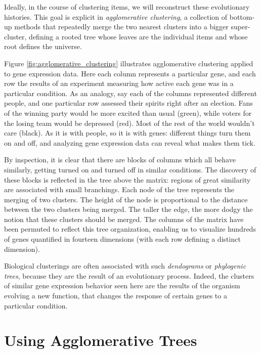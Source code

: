\documentclass[10pt]{article}
\begin{document}
Ideally, in the course of clustering items, we will reconstruct these evolutionary histories. This goal is explicit in \emph{agglomerative clustering}, a collection of bottom-up methods that repeatedly merge the two nearest clusters into a bigger super-cluster, defining a rooted tree whose leaves are the individual items and whose root defines the universe.

Figure \ref{fig:agglomerative_clustering} illustrates agglomerative clustering applied to gene expression data. Here each column represents a particular gene, and each row the results of an experiment measuring how active each gene was in a particular condition. As an analogy, say each of the columns represented different people, and one particular row assessed their spirits right after an election. Fans of the winning party would be more excited than usual (green), while voters for the losing team would be depressed (red). Most of the rest of the world wouldn't care (black). As it is with people, so it is with genes: different things turn them on and off, and analyzing gene expression data can reveal what makes them tick.

By inspection, it is clear that there are blocks of columns which all behave similarly, getting turned on and turned off in similar conditions. The discovery of these blocks is reflected in the tree above the matrix: regions of great similarity are associated with small branchings. Each node of the tree represents the merging of two clusters. The height of the node is proportional to the distance between the two clusters being merged. The taller the edge, the more dodgy the notion that these clusters should be merged. The columns of the matrix have been permuted to reflect this tree organization, enabling us to visualize hundreds of genes quantified in fourteen dimensions (with each row defining a distinct dimension).

Biological clusterings are often associated with such \emph{dendograms} or \emph{phylogenic trees}, because they are the result of an evolutionary process. Indeed, the clusters of similar gene expression behavior seen here are the results of the organism evolving a new function, that changes the response of certain genes to a particular condition.

\section{Using Agglomerative Trees}
\end{document}

